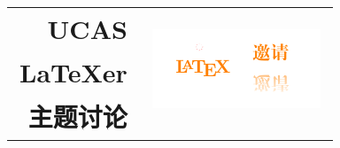 \documentclass[a0paper,fleqn]{betterposter}
\newcommand{\Time}{10:00--10:30 AM, 2019 年 9 月 7 日，周六}
\newcommand{\place}{玉泉图书馆二层会议室}
\begin{document}
{{%


}{



}
}{
}{

\title{%
\begin{tabular}{rp{.35\linewidth}}
UCAS & \multirow{3}{*}{\includegraphics[width=.6\textwidth]{invitation.pdf}} \\%
\LaTeX er\\[.2\baselineskip]
主题讨论 \\ %
\end{tabular}
}

}
\end{document}
